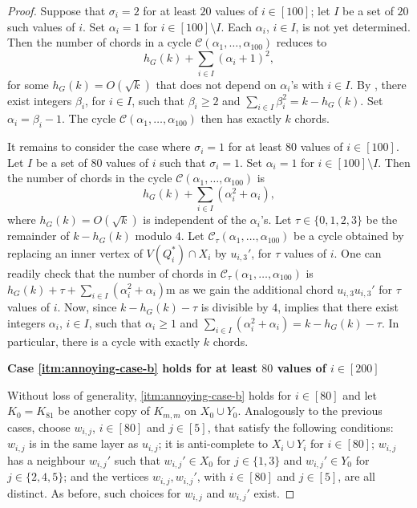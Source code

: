 \documentclass[10pt,a4paper]{amsart}
\theoremstyle{plain}
\theoremstyle{definition}
\newcommand{\C}{\mathcal{C}}
\begin{document}
\begin{proof}
        Suppose that $\sigma_i = 2$ for at least $20$ values of $i \in [100]$; let $I$ be a set of $20$ such values of $i$. Set $\alpha_i = 1$ for $i \in [100] \setminus I$. Each $\alpha_i$, $i \in I$, is not yet determined. Then the number of chords in a cycle $\C(\alpha_1, \ldots, \alpha_{100})$ reduces to 
        \begin{equation*}
            h_G(k) + \sum_{i \in I} (\alpha_i + 1)^2,
        \end{equation*}
        for some $h_G(k) = O(\sqrt{k})$ that does not depend on $\alpha_i$'s with $i \in I$. By , there exist integers $\beta_i$, for $i \in I$, such that $\beta_i \ge 2$ and $\sum_{i \in I} \beta_i^2 = k - h_G(k)$. Set $\alpha_i = \beta_i - 1$. The cycle $\C(\alpha_1, \ldots, \alpha_{100})$ then has exactly $k$ chords.
        
        It remains to consider the case where $\sigma_i = 1$ for at least $80$ values of $i \in [100]$. Let $I$ be a set of $80$ values of $i$ such that $\sigma_i=1$. Set $\alpha_i = 1$ for $i \in [100] \setminus I$. Then the number of chords in the cycle $\C(\alpha_1, \ldots, \alpha_{100})$ is 
        \begin{equation*} 
             h_G(k) + \sum_{i \in I} (\alpha_i^2 + \alpha_i),
        \end{equation*}
        where $h_G(k) = O(\sqrt{k})$ is independent of the $\alpha_i$'s. Let $\tau \in \{0, 1, 2, 3\}$ be the remainder of $k - h_G(k)$ modulo $4$. Let $\C_{\tau}(\alpha_1, \ldots, \alpha_{100})$ be a cycle obtained by replacing an inner vertex of $V(Q_i^*) \cap X_i$ by $u_{i, 3}'$, for $\tau$ values of $i$. One can readily check that the number of chords in $\C_{\tau}(\alpha_1, \ldots, \alpha_{100})$ is $h_G(k) + \tau + \sum_{i \in I} (\alpha_i^2 + \alpha_i)$m as we gain the additional chord $u_{i, 3} u_{i, 3}'$ for $\tau$ values of $i$. Now, since $k - h_G(k) - \tau$ is divisible by $4$,  implies that there exist integers $\alpha_i$, $i \in I$, such that $\alpha_i \ge 1$ and $\sum_{i \in I} (\alpha_i^2 + \alpha_i) = k - h_G(k) - \tau$. In particular, there is a cycle with exactly $k$ chords.
        
        \medskip
        
        \textbf{Case \ref{itm:annoying-case-b} holds for at least $80$ values of $i \in [200]$}
        
        Without loss of generality, \ref{itm:annoying-case-b} holds for $i \in [80]$ and let $K_0=K_{81}$ be another copy of $K_{m,m}$ on $X_0\cup Y_0$. Analogously to the previous cases, choose $w_{i, j}$, $i \in [80]$ and $j \in [5]$, that satisfy the following conditions: $w_{i, j}$ is in the same layer as $u_{i, j}$; it is anti-complete to $X_i \cup Y_i$ for $i \in [80]$; $w_{i, j}$ has a neighbour $w_{i, j}'$ such that $w_{i, j}' \in X_0$ for $j \in \{1, 3\}$ and $w_{i, j}' \in Y_0$ for $j \in \{2, 4, 5\}$; and the vertices $w_{i, j}, w_{i,j}'$, with $i \in [80]$ and $j \in [5]$, are all distinct. 
        As before, such choices for $w_{i,j}$ and $w_{i,j}'$ exist.
        

\end{proof}
\end{document}
